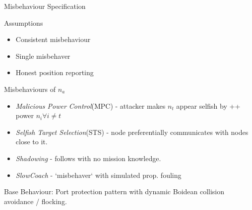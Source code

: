 \documentclass[aspectratio=169]{beamer}
\begin{document}
\begin{frame}{Misbehaviour Specification}
  \begin{alertblock}{Assumptions}
    \begin{itemize}
      \item Consistent misbehaviour
      \item Single misbehaver
      \item Honest position reporting 
    \end{itemize}
  \end{alertblock}
  \begin{block}{Misbehaviours of $n_a$}
    \begin{itemize}
      \item \emph{Malicious Power Control}(MPC) - attacker makes $n_t$ appear selfish by ++ power $n_i \forall i\neq t$
      \item \emph{Selfish Target Selection}(STS) - node preferentially communicates with nodes close to it.
      \item \emph{Shadowing} - follows with no mission knowledge.
      \item \emph{SlowCoach} - `misbehaver` with simulated prop. fouling 
    \end{itemize}
    Base Behaviour: Port protection pattern with dynamic Boidean collision avoidance / flocking.

  \end{block}

\end{frame}
\end{document}

